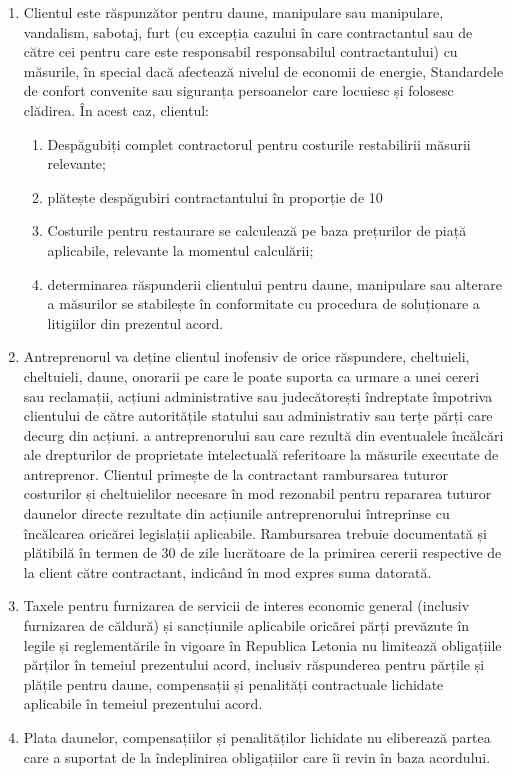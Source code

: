 \begin{multicols}{2}
\begin{enumerate}
\begin{enumerate}
\end{enumerate}
\item Clientul este răspunzător pentru daune, manipulare sau manipulare, vandalism, sabotaj, furt (cu excepția cazului în care contractantul sau de către cei pentru care este responsabil responsabilul contractantului) cu măsurile, în special dacă afectează nivelul de economii de energie, Standardele de confort convenite sau siguranța persoanelor care locuiesc și folosesc clădirea. În acest caz, clientul:
\begin{enumerate}
\item Despăgubiți complet contractorul pentru costurile restabilirii măsurii relevante;
\item plătește despăgubiri contractantului în proporție de 10%
\item Costurile pentru restaurare se calculează pe baza prețurilor de piață aplicabile, relevante la momentul calculării;
\item determinarea răspunderii clientului pentru daune, manipulare sau alterare a măsurilor se stabilește în conformitate cu procedura de soluționare a litigiilor din prezentul acord.
\end{enumerate}
\item Antreprenorul va deține clientul inofensiv de orice răspundere, cheltuieli, cheltuieli, daune, onorarii pe care le poate suporta ca urmare a unei cereri sau reclamații, acțiuni administrative sau judecătorești îndreptate împotriva clientului de către autoritățile statului sau administrativ sau terțe părți care decurg din acțiuni. a antreprenorului sau care rezultă din eventualele încălcări ale drepturilor de proprietate intelectuală referitoare la măsurile executate de antreprenor. Clientul primește de la contractant rambursarea tuturor costurilor și cheltuielilor necesare în mod rezonabil pentru repararea tuturor daunelor directe rezultate din acțiunile antreprenorului întreprinse cu încălcarea oricărei legislații aplicabile. Rambursarea trebuie documentată și plătibilă în termen de 30 de zile lucrătoare de la primirea cererii respective de la client către contractant, indicând în mod expres suma datorată.
\item Taxele pentru furnizarea de servicii de interes economic general (inclusiv furnizarea de căldură) și sancțiunile aplicabile oricărei părți prevăzute în legile și reglementările în vigoare în Republica Letonia nu limitează obligațiile părților în temeiul prezentului acord, inclusiv răspunderea pentru părțile și plățile pentru daune, compensații și penalități contractuale lichidate aplicabile în temeiul prezentului acord.
\item Plata daunelor, compensațiilor și penalităților lichidate nu eliberează partea care a suportat de la îndeplinirea obligațiilor care îi revin în baza acordului.
\end{enumerate}


\end{multicols}
